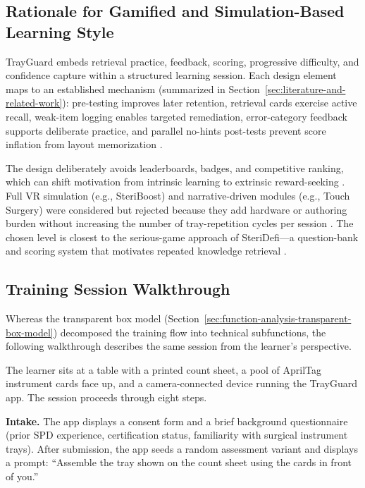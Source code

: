 \documentclass[10pt,a4paper]{article}
\begin{document}
\subsection{Rationale for Gamified and Simulation-Based Learning Style}

TrayGuard embeds retrieval practice, feedback, scoring, progressive difficulty,
and confidence capture within a structured learning session. Each design
element maps to an established mechanism (summarized in
Section~\ref{sec:literature-and-related-work}): pre-testing improves later retention,
retrieval cards exercise active recall, weak-item logging enables targeted
remediation, error-category feedback supports deliberate practice, and
parallel no-hints post-tests prevent score inflation from layout memorization
\cite{cook-et-al-2011, roediger-and-karpicke-2006, hattie-and-timperley-2007, issenberg-et-al-2005, bell-et-al-2008}.

The design deliberately avoids leaderboards, badges, and competitive
ranking, which can shift motivation from intrinsic learning to extrinsic
reward-seeking \cite{van-gaalen-et-al-2021}.
Full VR simulation (e.g., SteriBoost) and narrative-driven modules (e.g.,
Touch Surgery) were considered but rejected because they add hardware or
authoring burden without increasing the number of tray-repetition cycles per
session
\cite{steriboost-accessed-2026, tulipan-et-al-2019}.
The chosen level is closest to the serious-game approach of SteriDefi---a
question-bank and scoring system that motivates repeated knowledge retrieval
\cite{vanhaverbeke-et-al-2018}.

\subsection{Training Session Walkthrough}
\label{sec:training-session-walkthrough}

Whereas the transparent box model
(Section~\ref{sec:function-analysis-transparent-box-model}) decomposed the
training flow into technical subfunctions, the following walkthrough
describes the same session from the learner's perspective.

The learner sits at a table with a printed count sheet, a pool of
AprilTag instrument cards face up, and a camera-connected device running
the TrayGuard app. The session proceeds through eight steps.

\textbf{Intake.}
The app displays a consent form and a brief background questionnaire
(prior SPD experience, certification status, familiarity with surgical
instrument trays). After submission, the app seeds a random assessment
variant and displays a prompt: ``Assemble the tray shown on the count
sheet using the cards in front of you.''
\end{document}

